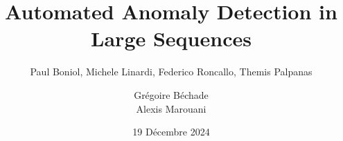 \documentclass[french]{beamer}
\title{Automated Anomaly Detection in Large Sequences}
\subtitle{ Paul Boniol, Michele Linardi, Federico Roncallo, Themis Palpanas}
\author{ Grégoire Béchade \\ Alexis Marouani}
\date{19 Décembre 2024}
\begin{document}
\begin{frame}
	\titlepage
\end{frame}
\end{document}
